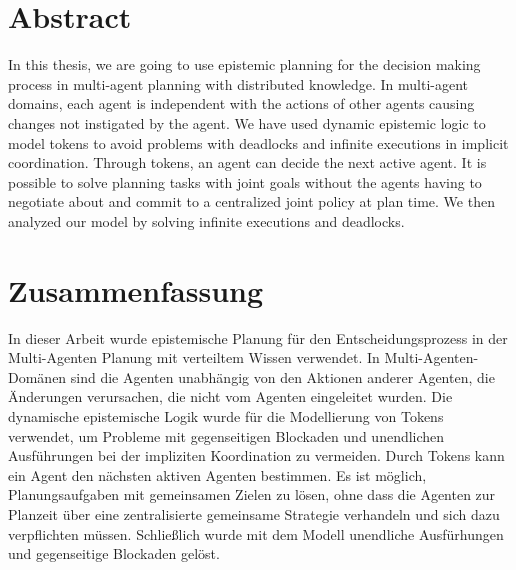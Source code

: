 \chapter*{Abstract}

In this thesis, we are going to use epistemic planning for the decision making process in multi-agent planning with distributed knowledge. In multi-agent domains, each agent is independent with the actions of other agents causing changes not instigated by the agent. We have used dynamic epistemic logic to model tokens to avoid problems with deadlocks and infinite executions in implicit coordination.
Through tokens, an agent can decide the next active agent. It is possible to solve planning tasks with joint goals without the agents having to negotiate about and commit to a centralized joint policy at plan time. We then analyzed our model by solving infinite executions and deadlocks.

\chapter*{Zusammenfassung}

In dieser Arbeit wurde epistemische Planung für den Entscheidungsprozess in der Multi-Agenten Planung mit verteiltem Wissen verwendet. In Multi-Agenten-Domänen sind die Agenten unabhängig von den Aktionen anderer Agenten, die Änderungen verursachen, die nicht vom Agenten eingeleitet wurden.
Die dynamische epistemische Logik wurde für die Modellierung von Tokens verwendet, um Probleme mit gegenseitigen Blockaden und unendlichen Ausführungen bei der impliziten Koordination zu vermeiden. Durch Tokens kann ein Agent den nächsten aktiven Agenten bestimmen. Es ist möglich, Planungsaufgaben mit gemeinsamen Zielen zu lösen, ohne dass die Agenten zur Planzeit über eine zentralisierte gemeinsame Strategie verhandeln und sich dazu verpflichten müssen. Schließlich wurde mit dem Modell unendliche Ausfürhungen und gegenseitige Blockaden gelöst.
